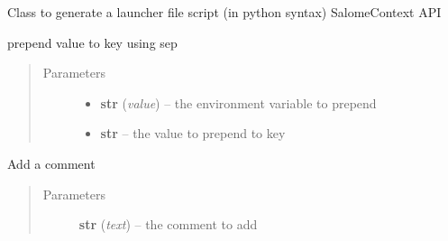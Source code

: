 \documentclass[a4paper,10pt,english]{sphinxmanual}
\begin{document}
\begin{fulllineitems}
\label{commands/apidoc/src:src.fileEnviron.LauncherFileEnviron}
Class to generate a launcher file script 
(in python syntax) SalomeContext API

\begin{fulllineitems}
\label{commands/apidoc/src:src.fileEnviron.LauncherFileEnviron.add}
prepend value to key using sep
\begin{quote}\begin{description}
\item[{Parameters}] \leavevmode\begin{itemize}
\item {} 
\textbf{str} (\emph{value}) -- the environment variable to prepend

\item {} 
\textbf{str} -- the value to prepend to key

\end{itemize}

\end{description}\end{quote}

\end{fulllineitems}


\begin{fulllineitems}
\label{commands/apidoc/src:src.fileEnviron.LauncherFileEnviron.add_comment}
\end{fulllineitems}


\begin{fulllineitems}
\label{commands/apidoc/src:src.fileEnviron.LauncherFileEnviron.add_echo}
Add a comment
\begin{quote}\begin{description}
\item[{Parameters}] \leavevmode
\textbf{str} (\emph{text}) -- the comment to add

\end{description}\end{quote}


\end{fulllineitems}
\end{fulllineitems}
\end{document}
